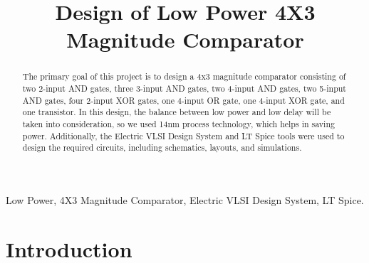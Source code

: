 \documentclass[conference]{IEEEtran}
\begin{document}
\title{Design of Low Power 4X3 Magnitude Comparator}

\author{
\and
{}
\and
{}
}


\maketitle

\begin{abstract}
The primary goal of this project is to design a 4x3 magnitude comparator consisting of two 2-input AND gates, three 3-input AND gates, two 4-input AND gates, two 5-input AND gates, four 2-input XOR gates, one 4-input OR gate, one 4-input XOR gate, and one transistor. In this design, the balance between low power and low delay will be taken into consideration, so we used 14nm process technology, which helps in saving power. Additionally, the Electric VLSI Design System and LT Spice tools were used to design the required circuits, including schematics, layouts, and simulations.
\end{abstract}

\begin{IEEEkeywords}

Low Power, 4X3 Magnitude Comparator, Electric VLSI Design System, LT Spice.

\end{IEEEkeywords}

\section{Introduction}
\end{document}
